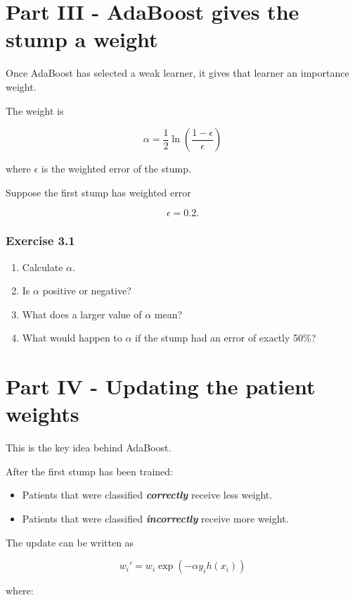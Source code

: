 \documentclass{course_sheet}
\begin{document}
\section*{Part III - AdaBoost gives the stump a weight}
Once AdaBoost has selected a weak learner, it gives that learner an importance weight.

The weight is

\[
{
\alpha
=
\frac{1}{2}
\ln
\left(
\frac{1-\epsilon}{\epsilon}
\right)
}
\]

where $\epsilon$ is the weighted error of the stump.

Suppose the first stump has weighted error

\[
\epsilon=0.2.
\]

\subsubsection*{Exercise 3.1}
\begin{enumerate}
\item
Calculate $\alpha$.

\item
Is $\alpha$ positive or negative?

\item
What does a larger value of $\alpha$ mean?

\item
What would happen to $\alpha$ if the stump had an error of exactly 50\%?

\end{enumerate}
\clearpage
\section*{Part IV - Updating the patient weights}
This is the key idea behind AdaBoost.

After the first stump has been trained:

\begin{itemize}
\item
Patients that were classified \textbf{\textit{correctly}} receive less weight.

\item
Patients that were classified \textbf{\textit{incorrectly}} receive more weight.

\end{itemize}
The update can be written as

\[
w_i'
=
w_i
\exp(-\alpha y_i h(x_i))
\]

where:
\end{document}
